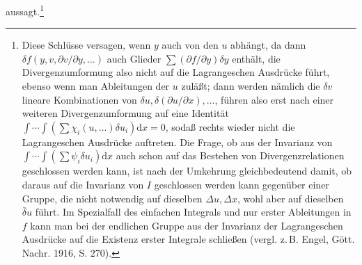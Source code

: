 \documentclass[11pt]{article}
\newcommand{\dd}{\mathrm d}
\newcommand{\D}{\Delta}
\newcommand{\bd}{\bar{\delta}}
\newcommand{\p}{\partial}
\begin{document}
aussagt.\footnote{Diese Schlüsse versagen, wenn \(y\) auch von den \(u\) abhängt, da dann \(\delta f(y,v,\p v/\p y,\ldots)\) auch Glieder \(\sum(\p f/\p y)\delta y\) enthält, die Divergenzumformung also nicht auf die Lagrangeschen Ausdrücke führt, ebenso wenn man Ableitungen der \(u\) zuläßt; dann werden nämlich die \(\delta v\) lineare Kombinationen von \(\delta u,\delta(\p u/\p x),\ldots\), führen also erst nach einer weiteren Divergenzumformung auf eine Identität \(\int\!\cdots\!\int(\sum\chi_i(u,\ldots)\delta u_i)\dd x=0\), sodaß rechts wieder nicht die Lagrangeschen Ausdrücke auftreten. Die Frage, ob aus der Invarianz von \(\int\!\cdots\!\int(\sum\psi_i\delta u_i)\dd x\) auch schon auf das Bestehen von Divergenzrelationen geschlossen werden kann, ist nach der Umkehrung gleichbedeutend damit, ob daraus auf die Invarianz von \(I\) geschlossen werden kann gegenüber einer Gruppe, die nicht notwendig auf dieselben \(\D u,\D x\), wohl aber auf dieselben \(\bd u\) führt. Im Spezialfall des einfachen Integrals und nur erster Ableitungen in \(f\) kann man bei der endlichen Gruppe aus der Invarianz der Lagrangeschen Ausdrücke auf die Existenz erster Integrale schließen (vergl. z.\,B. Engel, Gött. Nachr. 1916, S. 270).}
\end{document}
